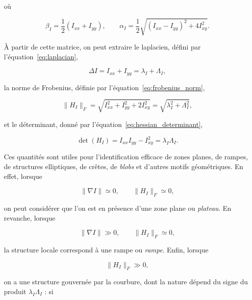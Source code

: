 où

\begin{equation}
\beta_I=\frac{1}{2}(I_{xx}+I_{yy}),
\qquad
\alpha_I=\frac{1}{2}\sqrt{(I_{xx}-I_{yy})^2+4I_{xy}^2}.
\label{eq:alpha_beta_hessian}
\end{equation}

À partir de cette matrice, on peut extraire le laplacien, défini par l’équation~\eqref{eq:laplacian},

\begin{equation}
\Delta I=I_{xx}+I_{yy}=\lambda_I+\Lambda_I,
\label{eq:laplacian}
\end{equation}

la norme de Frobenius, définie par l’équation~\eqref{eq:frobenius_norm},

\begin{equation}
\|H_I\|_F=\sqrt{I_{xx}^2+I_{yy}^2+2I_{xy}^2}
=
\sqrt{\lambda_I^2+\Lambda_I^2},
\label{eq:frobenius_norm}
\end{equation}

et le déterminant, donné par l’équation~\eqref{eq:hessian_determinant},

\begin{equation}
\det(H_I)=I_{xx}I_{yy}-I_{xy}^2=\lambda_I\Lambda_I.
\label{eq:hessian_determinant}
\end{equation}

Ces quantités sont utiles pour l’identification efficace de zones planes, de rampes, de structures elliptiques, de crêtes, de \textit{blobs} et d’autres motifs géométriques. En effet, lorsque

\begin{equation}
\|\nabla I\|\simeq 0,
\qquad
\|H_I\|_F\simeq 0,
\label{eq:plateau_condition}
\end{equation}

on peut considérer que l’on est en présence d’une zone plane ou \textit{plateau}. En revanche, lorsque

\begin{equation}
\|\nabla I\|\gg 0,
\qquad
\|H_I\|_F\simeq 0,
\label{eq:ramp_condition}
\end{equation}

la structure locale correspond à une rampe ou \textit{rampe}. Enfin, lorsque

\begin{equation}
\|H_I\|_F\gg 0,
\label{eq:curvature_condition}
\end{equation}

on a une structure gouvernée par la courbure, dont la nature dépend du signe du produit \(\lambda_I\Lambda_I\) : si

